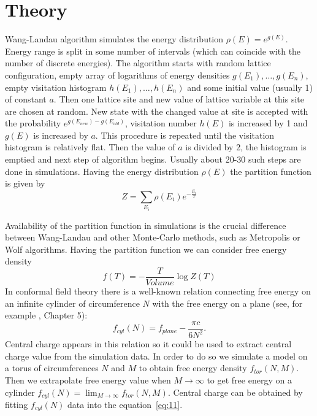 \documentclass[aps,prl,reprint]{revtex4-1}
\begin{document}
\section{Theory}
\label{sec:theory}

Wang-Landau algorithm simulates the energy distribution $\rho(E)=e^{g(E)}$. Energy range is split
in some number of intervals (which can coincide with the number of discrete energies). The algorithm starts with random
lattice configuration, empty array of logarithms of energy densities $g(E_{1}),\dots,g(E_{n})$,
empty visitation histogram $h(E_{1}),\dots,h(E_{n})$ and some initial value (usually
1) of constant $a$. Then one lattice site and new value of
lattice variable at this site are chosen at
random. New state with the changed value at site is accepted with the probability
$e^{g(E_{new})-g(E_{old})}$, visitation number $h(E)$ is increased by 1 and $g(E)$ is increased by
$a$. This procedure is repeated until the visitation histogram is relatively flat. Then the value of
$a$ is divided by 2, the histogram is emptied and next step of algorithm begins. Usually about 20-30
such steps are done in simulations. Having the energy distribution $\rho(E)$ the partition function
is given by
\begin{equation}
  \label{eq:8}
  Z=\sum_{E_{i}} \rho(E_{i}) e^{-\frac{E_{i}}{T}}
\end{equation}

Availability of the partition function in simulations is the crucial difference between Wang-Landau and
other Monte-Carlo methods, such as Metropolis or Wolf algorithms. Having the partition function we
can consider free energy density
\begin{equation}
  \label{eq:10}
  f(T)=-\frac{T}{Volume}\log Z(T)
\end{equation}
In conformal field theory there is a well-known relation connecting free energy on an infinite
cylinder of circumference $N$ with the free energy on a plane (see, for example
\cite{difrancesco1997cft}, Chapter 5):
\begin{equation}
  \label{eq:11}
  f_{cyl}(N)=f_{plane}-\frac{\pi c}{6 N^{2}}.
\end{equation}
Central charge appears in this relation so it could be used to extract central charge value from the
simulation data. In order to do so we simulate a model on a torus of circumferences $N$ and $M$
to obtain free energy density $f_{tor}(N,M)$. Then we extrapolate free energy value when $M\to\infty$
to get free energy on a cylinder $f_{cyl}(N)=\lim_{M\to\infty} f_{tor}(N,M)$. Central charge can be
obtained by fitting $f_{cyl}(N)$ data into the equation~\eqref{eq:11}. 
\end{document}
